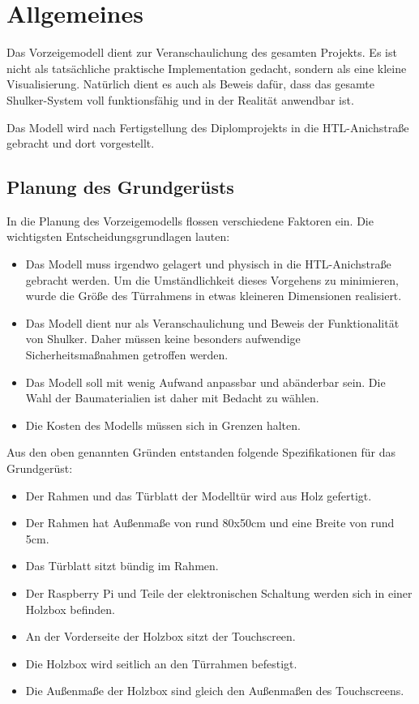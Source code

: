 \chapter{Allgemeines}
Das Vorzeigemodell dient zur Veranschaulichung des gesamten Projekts. Es ist nicht als tatsächliche
praktische Implementation gedacht, sondern als eine kleine Visualisierung. Natürlich dient es auch als Beweis dafür,
dass das gesamte Shulker-System voll funktionsfähig und in der Realität anwendbar ist.

Das Modell wird nach Fertigstellung des Diplomprojekts in die HTL-Anichstraße gebracht und dort vorgestellt.

\section{Planung des Grundgerüsts}
In die Planung des Vorzeigemodells flossen verschiedene Faktoren ein. Die wichtigsten Entscheidungsgrundlagen lauten:

\begin{itemize}
    \item Das Modell muss irgendwo gelagert und physisch in die HTL-Anichstraße gebracht werden. Um die Umständlichkeit
    dieses Vorgehens zu minimieren, wurde die Größe des Türrahmens in etwas kleineren Dimensionen realisiert.

    \item Das Modell dient nur als Veranschaulichung und Beweis der Funktionalität von Shulker. Daher müssen keine besonders aufwendige
    Sicherheitsmaßnahmen getroffen werden.

    \item Das Modell soll mit wenig Aufwand anpassbar und abänderbar sein. Die Wahl der Baumaterialien ist daher mit Bedacht
    zu wählen.

    \item Die Kosten des Modells müssen sich in Grenzen halten.
\end{itemize}

Aus den oben genannten Gründen entstanden folgende Spezifikationen für das Grundgerüst:

\begin{itemize}
    \item Der Rahmen und das Türblatt der Modelltür wird aus Holz gefertigt.
    \item Der Rahmen hat Außenmaße von rund 80x50cm und eine Breite von rund 5cm.
    \item Das Türblatt sitzt bündig im Rahmen.
    \item Der Raspberry Pi und Teile der elektronischen Schaltung werden sich in einer Holzbox befinden.
    \item An der Vorderseite der Holzbox sitzt der Touchscreen.
    \item Die Holzbox wird seitlich an den Türrahmen befestigt.
    \item Die Außenmaße der Holzbox sind gleich den Außenmaßen des Touchscreens.
\end{itemize}

